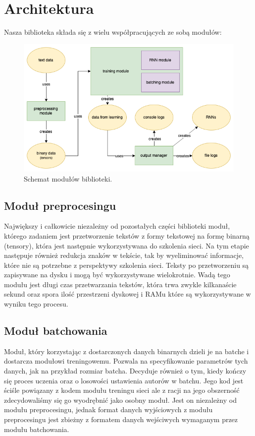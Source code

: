 \newpage
\section{Architektura}
Nasza biblioteka składa się z wielu współpracujących ze sobą modułów:
\begin{figure}[!ht]
\includegraphics[width=\linewidth]{./images/modules.png}
\caption{Schemat modułów biblioteki.}
\label{fig:test3}
\end{figure}

\subsection{Moduł preprocesingu}
Największy i całkowicie niezależny od pozostałych części biblioteki moduł, którego zadaniem jest 
przetworzenie tekstów z formy tekstowej na formę binarną (tensory), która jest następnie wykorzystywana
do szkolenia sieci. Na tym etapie następuje również redukcja znaków w tekście, tak by wyeliminować
informacje, które nie są potrzebne z perspektywy szkolenia sieci. Teksty po przetworzeniu są 
zapisywane na dysku i mogą być wykorzystywane wielokrotnie. 
Wadą tego modułu jest długi czas przetwarzania tekstów, która trwa zwykle kilkanaście sekund oraz spora ilość
przestrzeni dyskowej i RAMu które są wykorzystywane w wyniku tego procesu.

\subsection{Moduł batchowania}
Moduł, który korzystając z dostarczonych danych binarnych dzieli je na batche i dostarcza modułowi treningowemu.
Pozwala na specyfikowanie parametrów tych danych, jak na przykład rozmiar batcha.
Decyduje również o tym, kiedy kończy się proces uczenia oraz o losowości ustawienia autorów w batchu. 
Jego kod jest ściśle powiązany z kodem modułu treningu sieci ale z racji na jego obszerność zdecydowaliśmy 
się go wyodrębnić jako osobny moduł. 
Jest on niezależny od modułu preprocesingu, jednak format danych wyjściowych z modułu preprocesingu 
jest zbieżny z formatem danych wejściwych wymaganym przez modułu batchowania. 

